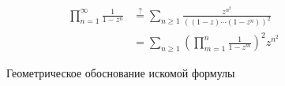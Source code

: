 \begin{align*}
    \prod_{n=1}^\infty\frac{1}{1-z^n} & \stackrel{?}{=} \sum_{n\ge 1}\frac{z^{n^2}}{((1-z)\cdots(1-z^n))^2}        \\
                                      & = \sum_{n \geq 1} \left(\prod_{m = 1}^n \frac{1}{1 - z^m}\right)^2 z^{n^2}
\end{align*}

\begin{figure}[h]
    \centering
    
    \caption{Геометрическое обоснование искомой формулы}
\end{figure}


